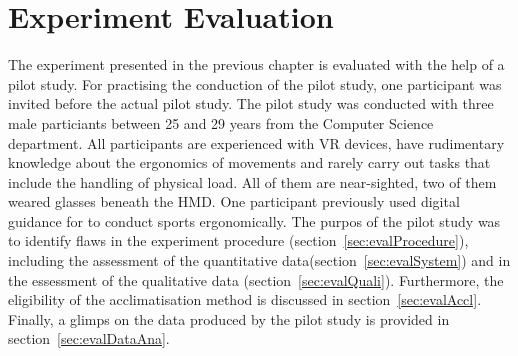 \chapter{Experiment Evaluation}
\label{chapter:study_evaluation}
The experiment presented in the previous chapter is evaluated with the help of a pilot study. For practising the conduction of the pilot study, one participant was invited before the actual pilot study. The pilot study was conducted with three male particiants between 25 and 29 years from the Computer Science department. All participants are experienced with VR devices, have rudimentary knowledge about the ergonomics of movements and rarely carry out tasks that include the handling of physical load. All of them are near-sighted, two of them weared glasses beneath the HMD. One participant previously used digital guidance for to conduct sports ergonomically. The purpos of the pilot study was to identify flaws in the experiment procedure (section~\ref{sec:evalProcedure}), \exgo including the assessment of the quantitative data(section~\ref{sec:evalSystem}) and in the essessment of the qualitative data (section~\ref{sec:evalQuali}). Furthermore, the eligibility of the acclimatisation method is discussed in section~\ref{sec:evalAccl}. Finally, a glimps on the data produced by the pilot study is provided in section~\ref{sec:evalDataAna}.

